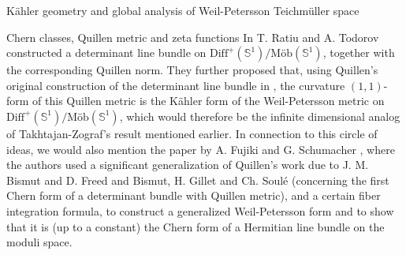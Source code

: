 \documentclass[12pt]{amsart}
\theoremstyle{plain}
\theoremstyle{definition}
\theoremstyle{remark}
\numberwithin{equation}{section} %
\numberwithin{figure}{section} %
\begin{document}
\begin{section}{K\"ahler geometry and global analysis of Weil-Petersson Teichm\"uller space}
\begin{subsection}{Chern classes, Quillen metric and zeta functions}
In \cite{RatiuTodorov} T. Ratiu and A. Todorov constructed a determinant line bundle on $\text{Diff}^{+}(\mathbb{S}^1)/\text{M\"ob} (\mathbb{S}^1)$, together with the corresponding Quillen norm. They further proposed that, using Quillen's original construction of the determinant line bundle in \cite{Quillen}, the curvature \((1,1)\)-form of this Quillen metric is the Kähler form of the Weil-Petersson metric on $\text{Diff}^{+}(\mathbb{S}^1)/\text{M\"ob} (\mathbb{S}^1)$, which would therefore be the infinite dimensional analog of Takhtajan-Zograf's result mentioned earlier. 
In connection to this circle of ideas, we would also mention the paper by A. Fujiki and G. Schumacher \cite{FujikiSchumacher}, where the authors 
used a significant generalization of Quillen's work due to J. M. Bismut and D. Freed \cite{BismutFreed} and Bismut, H. Gillet and Ch. Soul\'e \cite{BismutGilletSoule} (concerning the first Chern form of a determinant bundle with Quillen metric), and a certain fiber integration formula, to construct a generalized Weil-Petersson form and to show that it is (up to a constant) the Chern form of a Hermitian line bundle on the moduli space.
\end{subsection}



\end{section}
\end{document}
